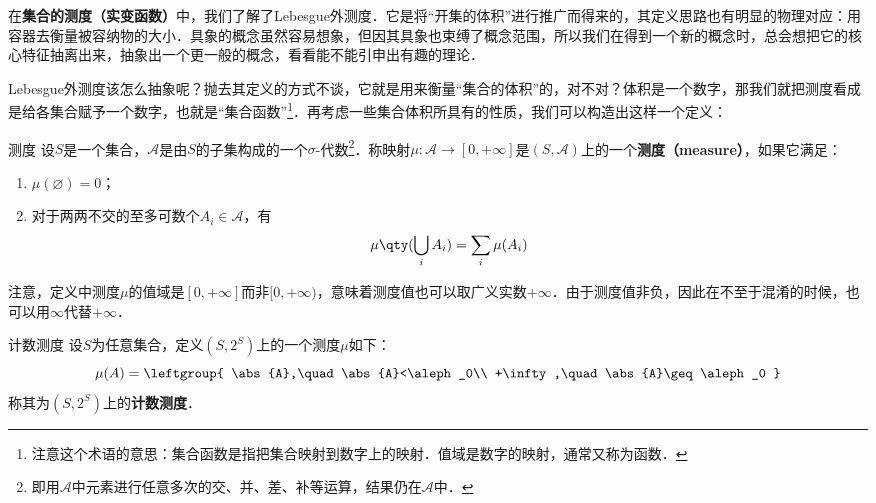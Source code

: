 

在\textbf{集合的测度（实变函数）}中，我们了解了Lebesgue外测度．它是将“开集的体积”进行推广而得来的，其定义思路也有明显的物理对应：用容器去衡量被容纳物的大小．具象的概念虽然容易想象，但因其具象也束缚了概念范围，所以我们在得到一个新的概念时，总会想把它的核心特征抽离出来，抽象出一个更一般的概念，看看能不能引申出有趣的理论．

Lebesgue外测度该怎么抽象呢？抛去其定义的方式不谈，它就是用来衡量“集合的体积”的，对不对？体积是一个数字，那我们就把测度看成是给各集合赋予一个数字，也就是“集合函数”\footnote{注意这个术语的意思：集合函数是指把集合映射到数字上的映射．值域是数字的映射，通常又称为函数．}．再考虑一些集合体积所具有的性质，我们可以构造出这样一个定义：

\begin{definition}{测度}\label{GenFun_def1}
设$S$是一个集合，$\mathcal{A}$是由$S$的子集构成的一个$\sigma$-代数\footnote{即用$\mathcal{A}$中元素进行任意多次的交、并、差、补等运算，结果仍在$\mathcal{A}$中．}．称映射$\mu:\mathcal{A}\to [0, +\infty]$是$(S, \mathcal{A})$上的一个\textbf{测度（measure）}，如果它满足：
\begin{enumerate}
\item $\mu(\varnothing)=0$；\\
\item 对于两两不交的至多可数个$A_i\in\mathcal{A}$，有
\begin{equation}
\mu\qty(\bigcup_i A_i) = \sum_i \mu(A_i)
\end{equation}
\end{enumerate}
\end{definition}

注意，定义中测度$\mu$的值域是$[0, +\infty]$而非$[0, +\infty)$，意味着测度值也可以取广义实数$+\infty$．由于测度值非负，因此在不至于混淆的时候，也可以用$\infty$代替$+\infty$．

\begin{example}{计数测度}
设$S$为任意集合，定义$(S, 2^S)$上的一个测度$\mu$如下：
\begin{equation}
\mu(A)=
\leftgroup{
    \abs{A},\quad \abs{A}<\aleph_0\\
    +\infty,\quad \abs{A}\geq\aleph_0
}
\end{equation}
称其为$(S, 2^S)$上的\textbf{计数测度}．
\end{example}

